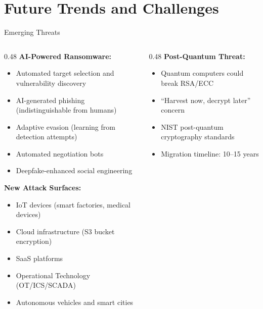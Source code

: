 \documentclass[aspectratio=169]{beamer}
\begin{document}
\section{Future Trends and Challenges}

\begin{frame}{Emerging Threats}
  \begin{columns}[T]
    \begin{column}{0.48\textwidth}
      \textbf{AI-Powered Ransomware:}
      \begin{itemize}
        \item Automated target selection and vulnerability discovery
        \item AI-generated phishing (indistinguishable from humans)
        \item Adaptive evasion (learning from detection attempts)
        \item Automated negotiation bots
        \item Deepfake-enhanced social engineering
      \end{itemize}

      \vspace{0.5em}
      \textbf{New Attack Surfaces:}
      \begin{itemize}
        \item IoT devices (smart factories, medical devices)
        \item Cloud infrastructure (S3 bucket encryption)
        \item SaaS platforms
        \item Operational Technology (OT/ICS/SCADA)
        \item Autonomous vehicles and smart cities
      \end{itemize}
    \end{column}
    \begin{column}{0.48\textwidth}
      \textbf{Post-Quantum Threat:}
      \begin{itemize}
        \item Quantum computers could break RSA/ECC
        \item ``Harvest now, decrypt later'' concern
        \item NIST post-quantum cryptography standards
        \item Migration timeline: 10--15 years
      \end{itemize}


\end{column}
\end{columns}
\end{frame}
\end{document}
